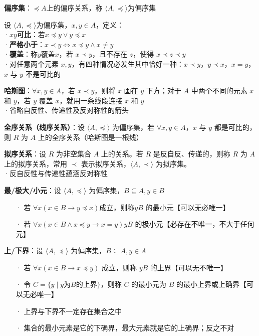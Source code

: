 	\textbf{偏序集}：$\preccurlyeq$$A$上的偏序关系，称 $\langle A, \preccurlyeq \rangle$为偏序集
	
	设  $\langle A, \preccurlyeq \rangle$为偏序集，$x, y \in A$，定义：\\	
	·$x$$y$\textbf{可比}：若$x \preccurlyeq y \lor y \preccurlyeq x$\\
	·\textbf{严格小于}：$x \prec y \Leftrightarrow x \preccurlyeq y \land x \neq y$\\
	·\textbf{覆盖}：称$y$覆盖$x$，若 $x \prec y$，且不存在 $z$，使得 $x \prec z \prec y$\\
	·对任意两个元素 $x, y$，有四种情况必发生其中恰好一种：$x \prec y$，$y \prec x$，$x = y$，$x$ 与 $y$ 不是可比的
	
	\textbf{哈斯图}：$\forall x, y \in A$，若 $x \prec y$，则将 $x$ 画在 $y$ 下方；对于 $A$ 中两个不同的元素 $x$ 和 $y$，若 $y$ 覆盖 $x$，就用一条线段连接 $x$ 和 $y$\\
	·省略自反性、传递性及反对称性的箭头
	
	\textbf{全序关系（线序关系）}：设 $\langle A, \preccurlyeq \rangle$ 为偏序集，若 $\forall x, y \in A$，$x$ 与 $y$ 都是可比的，则 $R$ 为 $A$ 上的全序关系（哈斯图是一根线）
	
	\textbf{拟序关系}：设 $R$ 为非空集合 $A$ 上的关系。若 $R$ 是反自反、传递的，则称 $R$ 为 $A$ 上的拟序关系，常用 $\prec$ 表示拟序关系，$\langle A, \prec \rangle$ 为拟序集。\\
	·反自反性与传递性蕴涵反对称性
	
	\textbf{最/极大/小元}：设 $\langle A, \preccurlyeq \rangle$ 为偏序集，$B \subseteq A, y \in B$
	\begin{itemize}
		\item[·] 若 $\forall x (x \in B \to y \preccurlyeq x)$成立，则称$y$$B$ 的最小元【可以无必唯一】
		\item[·] 若 $\forall x (x \in B \land x \preccurlyeq y \to x = y)$$y$$B$ 的极小元【必存在不唯一，不大于任何元】
	\end{itemize}
	
	\textbf{上/下界}：设 $\langle A, \preccurlyeq \rangle$ 为偏序集，$B \subseteq A, y \in A$
	\begin{itemize}
		\item[·] 若 $\forall x (x \in B \to x \preccurlyeq y)$ 成立，则称 $y$$B$ 的上界【可以无不唯一】
		\item[·] 令 $C = \{ y \mid y \text{为} B \text{的上界} \}$，则称 $C$ 的最小元为 $B$ 的最小上界或上确界【可以无必唯一】
		\item[·] 上界与下界不一定存在集合之中
		\item[·] 集合的最小元素是它的下确界，最大元素就是它的上确界；反之不对
	\end{itemize}
	
